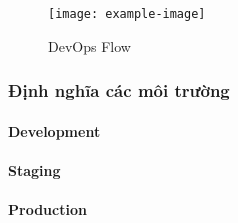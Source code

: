 
\blindtext

\begin{figure}[h]
	\caption{DevOps Flow}
	\centering
	\texttt{[image: example-image]}
	\label{fig:devops:flow}
\end{figure}

\blindtext

\subsubsection{Định nghĩa các môi trường}

\blindtext

\paragraph{Development}
\blindtext
\paragraph{Staging}
\blindtext
\paragraph{Production}
\blindtext
